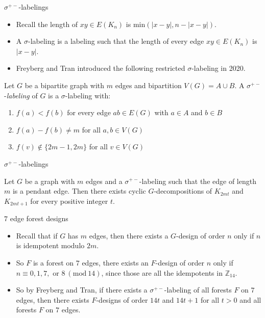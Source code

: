 \documentclass{beamer}
\theoremstyle{plain}
\newcommand{\ZZ}{\ensuremath{\mathbb{Z}}}
\newcommand{\Mod}[1]{\ (\mathrm{mod}\ #1)}
\begin{document}
    \begin{frame}{$\sigma^{+-}$-labelings}
        \begin{itemize}
            \item Recall the length of  $xy \in E(K_n)$ is min$(|x-y|,n-|x-y|).$
            \pause
            \item A $\sigma$-labeling is a labeling such that the length of every edge $xy \in E(K_n)$ is $|x-y|.$
            \pause
            \item Freyberg and Tran introduced the following restricted $\sigma$-labeling in 2020.
        \end{itemize}
        \begin{definition}
         Let $G$ be a bipartite graph with $m$ edges and bipartition $V(G)=A\cup B$. A $\sigma^{+-}$-\emph{labeling} of $G$ is a $\sigma$-labeling with:
        \begin{enumerate}
            \item $f(a)<f(b)$ for every edge $ab\in E(G)$ with $a\in A$ and $b \in B$
            \item $f(a)-f(b) \neq m$ for all $a,b \in V(G)$
            \item $f(v) \not \in \{2m-1,2m\}$ for all $v \in V(G)$
        \end{enumerate}   
        \end{definition}    
        
        \end{frame}
        \begin{frame}{$\sigma^{+-}$-labelings}
            \begin{theorem}  
        Let $G$ be a graph with $m$ edges and a $\sigma^{+-}$-labeling such that the edge of length $m$ is a pendant edge. Then there exists cyclic $G$-decompositions of $K_{2mt}$ and $K_{2mt+1}$ for every positive integer $t.$
        \end{theorem}
        
        \end{frame}

    \begin{frame}{$7$ edge forest designs}
        \begin{itemize}
            \item Recall that if $G$ has $m$ edges, then there exists a $G$-design of order $n$ only if $n$ is idempotent modulo $2m$.
            \item So $F$ is a forest on $7$ edges, there exists an $F$-design of order $n$ only if $n\equiv 0,1,7,\text{ or }8\Mod{14}$, since those are all the idempotents in $\ZZ_{14}$.
            \item So by Freyberg and Tran, if there exists a $\sigma^{+-}$-labeling of all forests $F$ on $7$ edges, then there exists $F$-designs of order $14t$ and $14t+1$ for all $t>0$ and all forests $F$ on $7$ edges.
        \end{itemize}
    \end{frame}
\end{document}
